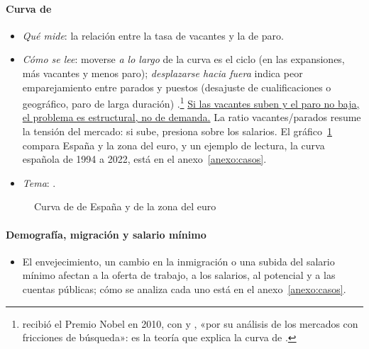 \documentclass[11pt]{article}
\begin{document}
\paragraph{Curva de }
\begin{itemize}
\item \emph{Qué mide}: la relación entre la tasa de vacantes y la de paro.
\item \emph{Cómo se lee}: moverse \emph{a lo largo} de la curva es el ciclo (en las expansiones, más vacantes y menos paro); \emph{desplazarse hacia fuera} indica peor emparejamiento entre parados y puestos (desajuste de cualificaciones o geográfico, paro de larga duración) \parencite{BlanchardDiamond1989}.\footnote{ recibió el Premio Nobel en 2010, con  y , «por su análisis de los mercados con fricciones de búsqueda»\nocite{Nobel2010DiamondMortensenPissarides}: es la teoría que explica la curva de .} \uline{Si las vacantes suben y el paro no baja, el problema es estructural, no de demanda.} La ratio vacantes/parados resume la tensión del mercado: si sube, presiona sobre los salarios. El gráfico~\ref{fig:beveridge} compara España y la zona del euro, y un ejemplo de lectura, la curva española de 1994 a 2022, está en el anexo~\ref{anexo:casos}.
\item \emph{Tema}: .
\end{itemize}

\begin{figure}[!htb]
\centering
\caption{Curva de  de España y de la zona del euro}\label{fig:beveridge}
\end{figure}

\paragraph{Demografía, migración y salario mínimo}
\begin{itemize}
\item El envejecimiento, un cambio en la inmigración o una subida del salario mínimo afectan a la oferta de trabajo, a los salarios, al potencial y a las cuentas públicas; cómo se analiza cada uno está en el anexo~\ref{anexo:casos}.
\end{itemize}
\end{document}
